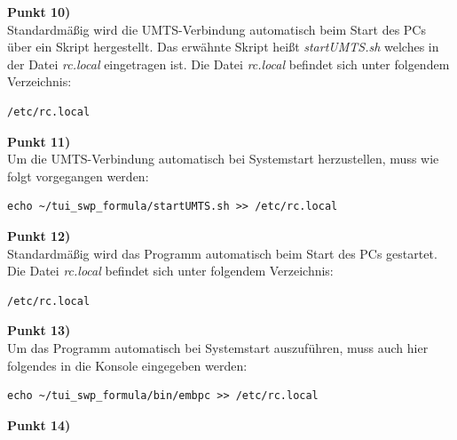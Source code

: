 \documentclass[fontsize = 12pt, paper = a4]{scrreprt}
\begin{document}
\textbf{Punkt 10)} \\

Standardmäßig wird die UMTS-Verbindung automatisch beim Start des PCs über ein Skript hergestellt. Das erwähnte Skript heißt \textit{startUMTS.sh} welches in der Datei  \textit{rc.local } eingetragen ist. Die Datei \textit{rc.local} befindet sich unter folgendem Verzeichnis:

\vspace*{4mm}
\begin{lstlisting}[frame=single]
/etc/rc.local
\end{lstlisting} 
\vspace*{-2mm}

\textbf{Punkt 11)} \\

Um die UMTS-Verbindung automatisch bei Systemstart herzustellen, muss wie folgt vorgegangen werden:

\vspace*{4mm}
\begin{lstlisting}[frame=single]
echo ~/tui_swp_formula/startUMTS.sh >> /etc/rc.local
\end{lstlisting} 
\vspace*{-2mm}

\textbf{Punkt 12)} \\

Standardmäßig wird das Programm automatisch beim Start des PCs gestartet. Die Datei \textit{rc.local} befindet sich unter folgendem Verzeichnis:

\vspace*{4mm}
\begin{lstlisting}[frame=single]
/etc/rc.local
\end{lstlisting} 
\vspace*{-2mm}

\textbf{Punkt 13)} \\

Um das Programm automatisch bei Systemstart auszuführen, muss auch hier folgendes in die Konsole eingegeben werden:

\vspace*{4mm}
\begin{lstlisting}[frame=single]
echo ~/tui_swp_formula/bin/embpc >> /etc/rc.local
\end{lstlisting} 
\vspace*{-2mm}

\newpage

\textbf{Punkt 14)} \\
\end{document}
